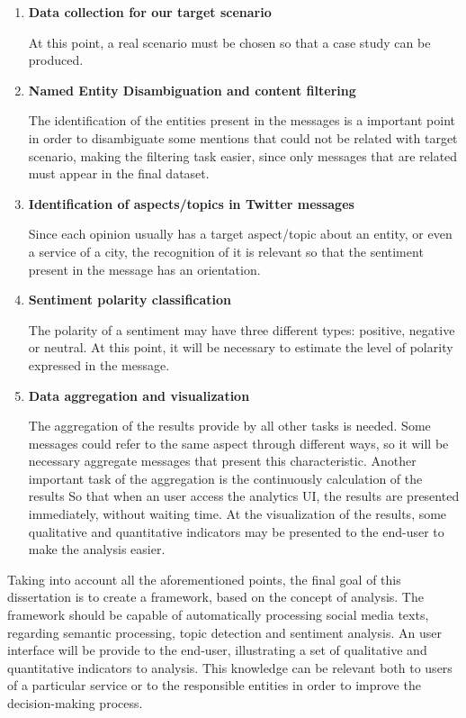 \begin{enumerate}
	\item \textbf{Data collection for our target scenario}
	
	At this point, a real scenario must be chosen so that a case study can be produced.
	
	\item \textbf{Named Entity Disambiguation and content filtering}
	
	The identification of the entities present in the messages is a important point in order to disambiguate some mentions that could not be related with target scenario, making the filtering task easier, since only messages that are related must appear in the final dataset.
	
	\item \textbf{Identification of aspects/topics in Twitter messages}
	
	Since each opinion usually has a target aspect/topic about an entity, or even a service of a city, the recognition of it is relevant so that the sentiment present in the message has an orientation.
	
	\item \textbf{Sentiment polarity classification}
	
	The polarity of a sentiment may have three different types: positive, negative or neutral. At this point, it will be necessary to estimate the level of polarity expressed in the message.
	
	\item \textbf{Data aggregation and visualization}
	
	The aggregation of the results provide by all other tasks is needed. Some messages could refer to the same aspect through different ways, so it will be  necessary aggregate messages that present this characteristic. Another important task of the aggregation is the continuously calculation of the results So that when an user access the analytics UI, the results are presented immediately, without waiting time. At the visualization of the results, some qualitative and quantitative indicators may be presented to the end-user to make the analysis easier.
	
\end{enumerate}

Taking into account all the aforementioned points, the final goal of this dissertation is to create a framework, based on the concept of analysis. The framework should be capable of automatically processing social media texts, regarding semantic processing, topic detection and sentiment analysis. An user interface will be provide to the end-user, illustrating a set of qualitative and quantitative indicators to analysis. This knowledge can be relevant both to users of a particular service or to the responsible entities in order to improve the decision-making process.

